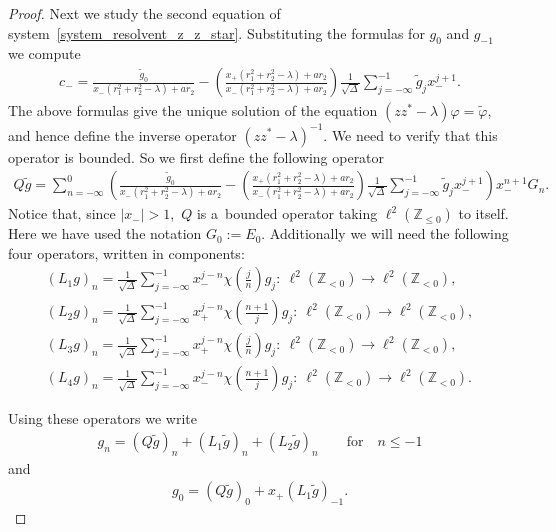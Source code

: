 \begin{proof}
Next we study the second equation of system~\eqref{system_resolvent_z_z_star}.
Substituting the formulas for $g_{0}$ and $g_{-1}$ we compute
\begin{gather*}
c_-=\frac{\tilde{g}_0}{x_-(r_1^2+r_2^2-\lambda)+ar_2}-\left(\frac{{x_+(r_1^2+r_2^2-\lambda)+ar_2}}{x_-(r_1^2+r_2^2-\lambda)+ar_2}\right)
\frac{1}{\sqrt{\Delta}}\sum\limits_{j=-\infty}^{-1}\tilde{g}_jx_-^{j+1}.
\end{gather*}
The above formulas give the unique solution of the equation $(zz^*-\lambda)\varphi=\tilde{\varphi}$, and hence def\/ine
the inverse operator $(zz^*-\lambda)^{-1}$.
We need to verify that this operator is bounded.
So we f\/irst def\/ine the following operator
\begin{gather*}
Q\tilde{g}=\!\sum\limits_{n=-\infty}^0\!\! \left(\!\frac{\tilde{g}_0}{x_-(r_1^2+r_2^2-\lambda)+ar_2}-
\!\left(\frac{{x_+(r_1^2+r_2^2-\lambda)+ar_2}}{x_-(r_1^2+r_2^2-\lambda)+ar_2}\right)\!
\frac{1}{\sqrt{\Delta}}\! \sum\limits_{j=-\infty}^{-1}\!\! \tilde{g}_jx_-^{j+1}\!\right)\!x_-^{n+1}G_n.
\end{gather*}
Notice that, since $|x_-|>1$,~$Q$ is a~bounded operator taking $\ell^2({\mathbb Z}_{\leq 0})$ to itself.
Here we have used the notation $G_0:= E_0$.
Additionally we will need the following four operators, written in components:
\begin{gather*}%
\left(L_1g\right)_n =\frac{1}{\sqrt{\Delta}}\sum\limits_{j=-\infty}^{-1}x_-^{j-n}\chi\left(\frac{j}{n}\right)g_j: \
\ell^2({\mathbb Z}_{<0})\to \ell^2({\mathbb Z}_{<0}),
\\
\left(L_2g\right)_n =\frac{1}{\sqrt{\Delta}}\sum\limits_{j=-\infty}^{-1}x_+^{j-n}\chi\left(\frac{n+1}{j}\right)g_j: \
\ell^2({\mathbb Z}_{<0})\to \ell^2({\mathbb Z}_{<0}),
\\
\left(L_3g\right)_n =\frac{1}{\sqrt{\Delta}}\sum\limits_{j=-\infty}^{-1}x_+^{j-n}\chi\left(\frac{j}{n}\right)g_j: \
\ell^2({\mathbb Z}_{<0})\to \ell^2({\mathbb Z}_{<0}),
\\
\left(L_4g\right)_n =\frac{1}{\sqrt{\Delta}}\sum\limits_{j=-\infty}^{-1}x_-^{j-n}\chi\left(\frac{n+1}{j}\right)g_j: \
\ell^2({\mathbb Z}_{<0})\to \ell^2({\mathbb Z}_{<0}).
\end{gather*}

Using these operators we write
\begin{gather*}
g_n=\left(Q\tilde{g}\right)_n+\left(L_1\tilde{g}\right)_n+\left(L_2\tilde{g}\right)_n \qquad\text{for}\quad  n\leq -1
\end{gather*}
and
\begin{gather*}
g_0 =\left(Q\tilde{g}\right)_0+x_+\left(L_1\tilde{g}\right)_{-1}.
\end{gather*}


\end{proof}
